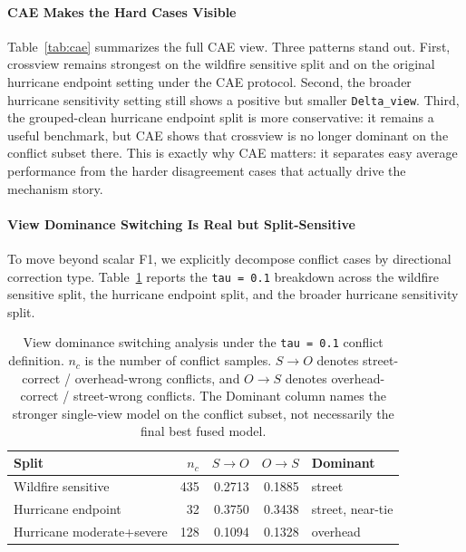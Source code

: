 \documentclass[sigconf]{acmart}
\begin{document}
\paragraph{CAE Makes the Hard Cases Visible}

Table~\ref{tab:cae} summarizes the full CAE view. Three patterns stand out.
First, crossview remains strongest on the wildfire sensitive split and on the
original hurricane endpoint setting under the CAE protocol. Second, the broader
hurricane sensitivity setting still shows a positive but smaller
\texttt{Delta\_view}. Third, the grouped-clean hurricane endpoint split is more conservative:
it remains a useful benchmark, but CAE shows that crossview is no longer
dominant on the conflict subset there. This is exactly why CAE matters: it
separates easy average performance from the harder disagreement cases that
actually drive the mechanism story.

\paragraph{View Dominance Switching Is Real but Split-Sensitive}

To move beyond scalar F1, we explicitly decompose conflict cases by directional
correction type. Table~\ref{tab:dominance} reports the \texttt{tau = 0.1}
breakdown across the wildfire sensitive split, the hurricane endpoint split,
and the broader hurricane sensitivity split.

\begin{table}[!tbp]
  \caption{View dominance switching analysis under the \texttt{tau = 0.1}
  conflict definition. $n_c$ is the number of conflict samples. $S{\rightarrow}O$ denotes street-correct /
  overhead-wrong conflicts, and $O{\rightarrow}S$ denotes overhead-correct /
  street-wrong conflicts. The Dominant column names the stronger single-view
  model on the conflict subset, not necessarily the final best fused model.}
  \label{tab:dominance}
  \centering
  \begin{tabular}{lrrrl}
    \toprule
    Split & $n_c$ & $S{\rightarrow}O$ & $O{\rightarrow}S$ & Dominant \\
    \midrule
    Wildfire sensitive & 435 & 0.2713 & 0.1885 & street \\
    Hurricane endpoint & 32 & 0.3750 & 0.3438 & street, near-tie \\
    Hurricane moderate+severe & 128 & 0.1094 & 0.1328 & overhead \\
    \bottomrule
  \end{tabular}
\end{table}
\end{document}
